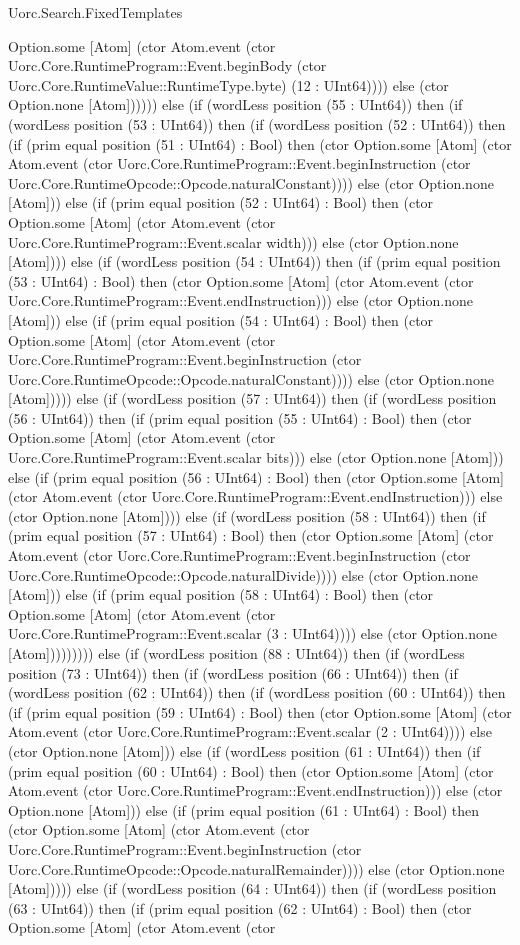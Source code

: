 \begin{lexlean}{Uorc.Search.FixedTemplates}
\begin{semanticmodule}
{Option.some [Atom] (ctor Atom.event (ctor Uorc.Core.RuntimeProgram::Event.beginBody (ctor Uorc.Core.RuntimeValue::RuntimeType.byte) (12 : UInt64)))) else (ctor Option.none [Atom]))))) else (if (wordLess position (55 : UInt64)) then (if (wordLess position (53 : UInt64)) then (if (wordLess position (52 : UInt64)) then (if (prim equal position (51 : UInt64) : Bool) then (ctor Option.some [Atom] (ctor Atom.event (ctor Uorc.Core.RuntimeProgram::Event.beginInstruction (ctor Uorc.Core.RuntimeOpcode::Opcode.naturalConstant)))) else (ctor Option.none [Atom])) else (if (prim equal position (52 : UInt64) : Bool) then (ctor Option.some [Atom] (ctor Atom.event (ctor Uorc.Core.RuntimeProgram::Event.scalar width))) else (ctor Option.none [Atom]))) else (if (wordLess position (54 : UInt64)) then (if (prim equal position (53 : UInt64) : Bool) then (ctor Option.some [Atom] (ctor Atom.event (ctor Uorc.Core.RuntimeProgram::Event.endInstruction))) else (ctor Option.none [Atom])) else (if (prim equal position (54 : UInt64) : Bool) then (ctor Option.some [Atom] (ctor Atom.event (ctor Uorc.Core.RuntimeProgram::Event.beginInstruction (ctor Uorc.Core.RuntimeOpcode::Opcode.naturalConstant)))) else (ctor Option.none [Atom])))) else (if (wordLess position (57 : UInt64)) then (if (wordLess position (56 : UInt64)) then (if (prim equal position (55 : UInt64) : Bool) then (ctor Option.some [Atom] (ctor Atom.event (ctor Uorc.Core.RuntimeProgram::Event.scalar bits))) else (ctor Option.none [Atom])) else (if (prim equal position (56 : UInt64) : Bool) then (ctor Option.some [Atom] (ctor Atom.event (ctor Uorc.Core.RuntimeProgram::Event.endInstruction))) else (ctor Option.none [Atom]))) else (if (wordLess position (58 : UInt64)) then (if (prim equal position (57 : UInt64) : Bool) then (ctor Option.some [Atom] (ctor Atom.event (ctor Uorc.Core.RuntimeProgram::Event.beginInstruction (ctor Uorc.Core.RuntimeOpcode::Opcode.naturalDivide)))) else (ctor Option.none [Atom])) else (if (prim equal position (58 : UInt64) : Bool) then (ctor Option.some [Atom] (ctor Atom.event (ctor Uorc.Core.RuntimeProgram::Event.scalar (3 : UInt64)))) else (ctor Option.none [Atom])))))))) else (if (wordLess position (88 : UInt64)) then (if (wordLess position (73 : UInt64)) then (if (wordLess position (66 : UInt64)) then (if (wordLess position (62 : UInt64)) then (if (wordLess position (60 : UInt64)) then (if (prim equal position (59 : UInt64) : Bool) then (ctor Option.some [Atom] (ctor Atom.event (ctor Uorc.Core.RuntimeProgram::Event.scalar (2 : UInt64)))) else (ctor Option.none [Atom])) else (if (wordLess position (61 : UInt64)) then (if (prim equal position (60 : UInt64) : Bool) then (ctor Option.some [Atom] (ctor Atom.event (ctor Uorc.Core.RuntimeProgram::Event.endInstruction))) else (ctor Option.none [Atom])) else (if (prim equal position (61 : UInt64) : Bool) then (ctor Option.some [Atom] (ctor Atom.event (ctor Uorc.Core.RuntimeProgram::Event.beginInstruction (ctor Uorc.Core.RuntimeOpcode::Opcode.naturalRemainder)))) else (ctor Option.none [Atom])))) else (if (wordLess position (64 : UInt64)) then (if (wordLess position (63 : UInt64)) then (if (prim equal position (62 : UInt64) : Bool) then (ctor Option.some [Atom] (ctor Atom.event (ctor }
\end{semanticmodule}
\end{lexlean}
